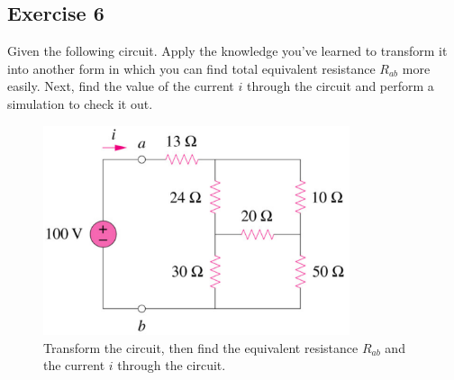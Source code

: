 \newpage

\subsection{Exercise 6}
Given the following circuit. Apply the knowledge you've learned to transform it into another form in which you can find total equivalent resistance $R_{ab}$ more easily. Next, find the value of the current $i$ through the circuit and perform a simulation to check it out.

\begin{figure}[H]
    \centering
    \includegraphics[width = 9cm]{source/picture/bai_1/lab1_ex6_de.png}
    \caption{Transform the circuit, then find the equivalent resistance $R_{ab}$ and the current $i$ through the circuit.}
    \label{lab1_ex6_de}
\end{figure}

